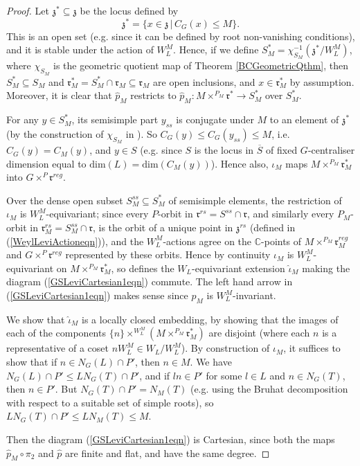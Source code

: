 \documentclass{amsart}
\theoremstyle{remark}
\numberwithin{theorem}{section}
\numberwithin{equation}{section}
\begin{document}
\begin{proof} 
Let $\mathfrak{z}^* \subseteq \mathfrak{z}$ be the locus defined by
\begin{equation}\label{GSLeviCartesian2eqn}
    \mathfrak{z}^* = \{ x \in \mathfrak{z} \, | \,C_G(x) \leq M \}.
\end{equation}
This is an open set (e.g. since it can be defined by root non-vanishing conditions), and it is stable under the action of $W_L^M$. Hence, if we define $S_M^* = \chi_{S_M}^{-1}(\mathfrak{z}^*/W_L^M)$, where $\chi_{S_M}$ is the geometric quotient map of Theorem \ref{BCGeometricQthm}, then $S_M^* \subseteq S_M$ and $\mathfrak{r}_M^* = S_M^* \cap \mathfrak{r}_M \subseteq \mathfrak{r}_M$ are open inclusions, and $x \in \mathfrak{r}_M^*$ by assumption. Moreover, it is clear that $\hat{p}_M$ restricts to $\hat{p}_M:M \times^{P_M} \mathfrak{r}^* \rightarrow S_M^*$ over $S_M^*$.

For any $y \in S_M^*$, its semisimple part $y_{ss}$ is conjugate under $M$ to an element of $\mathfrak{z}^*$ (by the construction of $\chi_{S_M}$ in \cite[Satz 5.6]{Borho2}). So $C_G(y) \leq C_G(y_{ss}) \leq M$, i.e. $C_G(y) = C_M(y)$, and $y \in S$ (e.g. since $S$ is the locus in $\overline{S}$ of fixed $G$-centraliser dimension equal to $\text{dim}(L) = \text{dim}(C_M(y))$). Hence also, $\iota_M$ maps $M \times^{P_M} \mathfrak{r}_M^*$ into $G \times^P \mathfrak{r}^{reg}$.

Over the dense open subset $S^{ss}_M \subseteq S^*_M$ of semisimple elements, the restriction of $\iota_M$ is $W_L^M$-equivariant; since every $P$-orbit in $\mathfrak{r}^{rs} = S^{ss} \cap \mathfrak{r}$, and similarly every $P_M$-orbit in $\mathfrak{r}^{rs}_M = S^{ss}_M \cap \mathfrak{r}$, is the orbit of a unique point in $\mathfrak{z}^{rs}$ (defined in (\ref{WeylLeviActioneqn})), and the $W_L^M$-actions agree on the $\mathbb{C}$-points of $M \times^{P_M} \mathfrak{r}_M^{reg}$ and $G \times^P\mathfrak{r}^{reg}$ represented by these orbits. Hence by continuity $\iota_M$ is $W_L^M$-equivariant on $M \times^{P_M} \mathfrak{r}_M^*$, so defines the $W_L$-equivariant extension $\hat{\iota}_M$ making the diagram (\ref{GSLeviCartesian1eqn}) commute. The left hand arrow in (\ref{GSLeviCartesian1eqn}) makes sense since $\hat{p}_M$ is $W_L^M$-invariant.

We show that $\hat{\iota}_M$ is a locally closed embedding, by showing that the images of each of the components $\{n\} \times^{W_L^M} (M \times^{P_M} \mathfrak{r}_M^*)$ are disjoint (where each $n$ is a representative of a coset $nW_L^M \in W_L/W_L^M$). By construction of $\iota_M$, it suffices to show that if $n \in N_G(L) \cap P'$, then $n \in M$. We have $N_G(L) \cap P' \leq LN_G(T) \cap P'$, and if $ln \in P'$ for some $l \in L$ and $n \in N_G(T)$, then $n \in P'$. But $ N_G(T) \cap P' = N_M(T)$ (e.g. using the Bruhat decomposition with respect to a suitable set of simple roots), so $LN_G(T) \cap P' \leq LN_M(T) \leq M$.

Then the diagram (\ref{GSLeviCartesian1eqn}) is Cartesian, since both the maps $\hat{p}_M \circ \pi_2$ and $\hat{p}$ are finite and flat, and have the same degree.
\end{proof}
\end{document}
